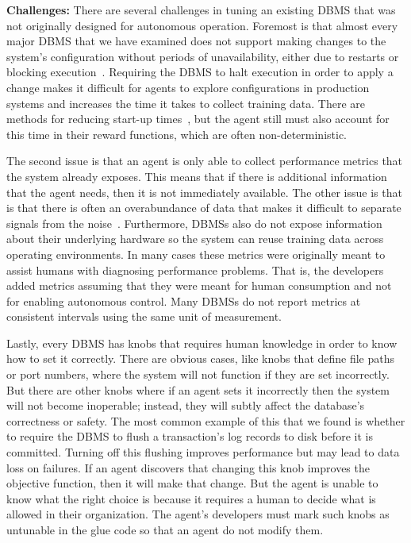 \documentclass[11pt,times]{article}
\begin{document}
\textbf{Challenges:}
There are several challenges in tuning an existing DBMS that was not originally designed for 
autonomous operation. Foremost is that almost every major DBMS that we have examined does not 
support 
making changes to the system's configuration without periods of unavailability, either due to 
restarts or blocking execution~\cite{pavlo19}. Requiring the DBMS to halt execution in order to 
apply a change makes it difficult for agents to explore 
configurations in production systems and increases the time it takes to collect training data.
There are methods for reducing start-up times~\cite{abraham13,graefe14}, but the agent still 
must also account for this time in their reward functions, which are often non-deterministic.

The second issue is that an agent is only able to collect performance metrics that 
the system already exposes. This means that if there is additional information that the agent 
needs, then it is not immediately available. The other issue is that is that there is often an 
overabundance of data that makes it difficult to 
separate signals from the noise~\cite{vanaken17}. Furthermore, DBMSs 
also do not expose information about their underlying hardware so the system can reuse 
training data across operating environments.
In many cases these metrics were originally meant to assist humans with 
diagnosing performance problems. That is, the developers added metrics 
assuming that they were meant for human consumption and not for enabling autonomous 
control. Many DBMSs do not report metrics at consistent intervals using the same unit of 
measurement.

Lastly, every DBMS has knobs that requires human knowledge in order to know how to 
set it correctly. There are obvious cases, like knobs that define file paths or port numbers, where 
the system will not function if they are set incorrectly. But there are other knobs where if an 
agent sets it incorrectly then the system will not become inoperable; instead, they will subtly 
affect the database's correctness or safety. The most common example of this that we found is 
whether to require the DBMS to flush a 
transaction's log records to disk before it is committed. Turning off this flushing improves 
performance but may lead to data loss on failures.
If an agent discovers that 
changing this knob improves the objective function, then it will make that change. But the agent 
is unable to know what the right choice is because it requires a human to 
decide what is allowed in their organization. The agent's developers must mark such knobs as 
untunable in the glue code so that an agent do not modify them.
\end{document}

